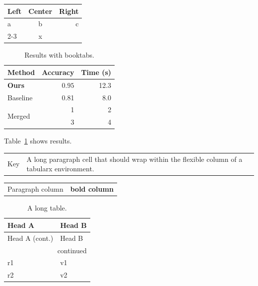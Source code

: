 \documentclass{article}
\begin{document}
\begin{tabular}{|l|c|r|}
\hline
Left & Center & Right \\
\hline\hline
a & b & c \\
\cline{2-3}
\multicolumn{2}{|c|}{Spans two} & x \\
\hline
\end{tabular}

\begin{table}[ht]
\centering
\caption{Results with booktabs.}\label{tab:res}
\begin{tabular}{@{}lrr@{}}
\toprule
Method & Accuracy & Time (s) \\
\midrule
\textbf{Ours} & $0.95$ & 12.3 \\
Baseline & 0.81 & 8.0 \\
\multirow{2}{*}{Merged} & 1 & 2 \\
 & 3 & 4 \\
\bottomrule
\end{tabular}
\end{table}
Table~\ref{tab:res} shows results.

\begin{tabularx}{\textwidth}{lX}
Key & A long paragraph cell that should wrap within the flexible column of a tabularx environment. \\
\end{tabularx}

\begin{tabular}{p{3cm}>{\bfseries}c}
Paragraph column & bold column \\
\end{tabular}

\begin{longtable}{ll}
\caption{A long table.}\\
Head A & Head B \\ \hline
\endfirsthead
Head A (cont.) & Head B \\ \hline
\endhead
\hline \multicolumn{2}{r}{continued} \\
\endfoot
\endlastfoot
r1 & v1 \\
r2 & v2 \\
\end{longtable}
\end{document}
